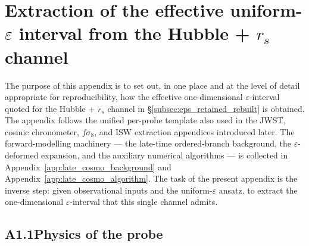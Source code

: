 %
%
%

\section{Extraction of the effective uniform-$\varepsilon$ interval
from the Hubble + $r_s$ channel}
\label{app:eps_extraction_hubble}

The purpose of this appendix is to set out, in one place and at the
level of detail appropriate for reproducibility, how the effective
one-dimensional $\varepsilon$-interval quoted for the Hubble + $r_s$
channel in \S\ref{subsec:eps_retained_rebuilt} is obtained. The
appendix follows the unified per-probe template also used in the
JWST, cosmic chronometer, $f\sigma_8$, and ISW extraction appendices
introduced later. The forward-modelling machinery ---
the late-time ordered-branch background, the $\varepsilon$-deformed
expansion, and the auxiliary numerical algorithms ---
is collected in Appendix~\ref{app:late_cosmo_background} and
Appendix~\ref{app:late_cosmo_algorithm}. The task of the present
appendix is the inverse step: given observational inputs and the
uniform-$\varepsilon$ ansatz, to extract the one-dimensional
$\varepsilon$-interval that this single channel admits.

\subsection*{A1.1\quad Physics of the probe}

